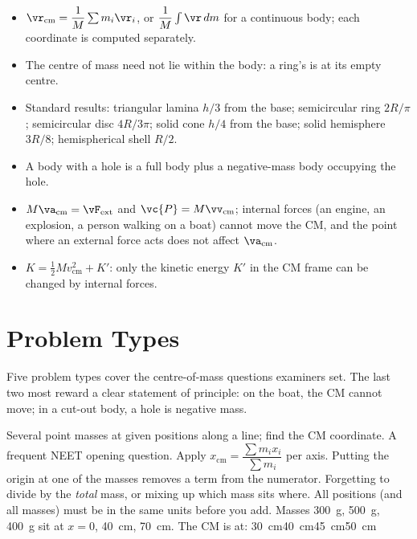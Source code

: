 \begin{itemize}
\item $\vr_{\text{cm}}=\dfrac1M\sum m_i\vr_i$, or $\dfrac1M\int\vr\,dm$ for a continuous body; each coordinate
      is computed separately.
\item The centre of mass need not lie within the body: a ring's is at its empty centre.
\item Standard results: triangular lamina $h/3$ from the base; semicircular ring $2R/\pi$; semicircular disc
      $4R/3\pi$; solid cone $h/4$ from the base; solid hemisphere $3R/8$; hemispherical shell $R/2$.
\item A body with a hole is a full body plus a negative-mass body occupying the hole.
\item $M\va_{\text{cm}}=\vF_{\text{ext}}$ and $\vc{P}=M\vv_{\text{cm}}$; internal forces (an engine, an
      explosion, a person walking on a boat) cannot move the CM, and the point where an external force acts does not affect $\va_{\text{cm}}$.
\item $K=\tfrac12Mv_{\text{cm}}^2+K'$: only the kinetic energy $K'$ in the CM frame can be changed by internal forces.
\end{itemize}

\section{Problem Types}\label{sec:types13}
Five problem types cover the centre-of-mass questions examiners set. The last two most reward a clear
statement of principle: on the boat, the CM cannot move; in a cut-out body, a hole is negative mass.

{Several point masses at given positions along a line; find the CM coordinate. A frequent NEET
opening question.}
{Apply $x_{\text{cm}}=\dfrac{\sum m_i x_i}{\sum m_i}$ per axis. Putting the origin at one of the masses removes a term from the numerator.}
{Forgetting to divide by the \emph{total} mass, or mixing up which mass sits where. All positions (and all masses) must be in the same units
before you add.}
{Masses \SI{300}{g}, \SI{500}{g}, \SI{400}{g} sit at $x=0$, \SI{40}{cm}, \SI{70}{cm}. The CM is at:}
{\SI{30}{cm}}{\SI{40}{cm}}{\SI{45}{cm}}{\SI{50}{cm}}

